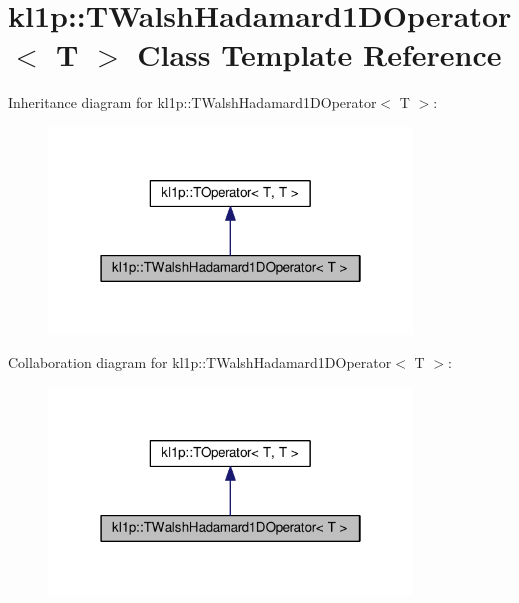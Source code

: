 \hypertarget{classkl1p_1_1TWalshHadamard1DOperator}{}\section{kl1p\+:\+:T\+Walsh\+Hadamard1\+D\+Operator$<$ T $>$ Class Template Reference}
\label{classkl1p_1_1TWalshHadamard1DOperator}


Inheritance diagram for kl1p\+:\+:T\+Walsh\+Hadamard1\+D\+Operator$<$ T $>$\+:
\nopagebreak
\begin{figure}[H]
\begin{center}
\leavevmode
\includegraphics[width=274pt]{classkl1p_1_1TWalshHadamard1DOperator__inherit__graph}
\end{center}
\end{figure}


Collaboration diagram for kl1p\+:\+:T\+Walsh\+Hadamard1\+D\+Operator$<$ T $>$\+:
\nopagebreak
\begin{figure}[H]
\begin{center}
\leavevmode
\includegraphics[width=274pt]{classkl1p_1_1TWalshHadamard1DOperator__coll__graph}
\end{center}
\end{figure}
